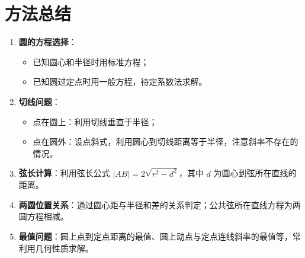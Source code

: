 \documentclass[11pt]{ctexrep}
\begin{document}
\section*{方法总结}

\begin{enumerate}
    \item \textbf{圆的方程选择}：
    \begin{itemize}
        \item 已知圆心和半径时用标准方程；
        \item 已知圆过定点时用一般方程，待定系数法求解。
    \end{itemize}
    \item \textbf{切线问题}：
    \begin{itemize}
        \item 点在圆上：利用切线垂直于半径；
        \item 点在圆外：设点斜式，利用圆心到切线距离等于半径，注意斜率不存在的情况。
    \end{itemize}
    \item \textbf{弦长计算}：利用弦长公式 $|AB| = 2\sqrt{r^2 - d^2}$，其中 $d$ 为圆心到弦所在直线的距离。
    \item \textbf{两圆位置关系}：通过圆心距与半径和差的关系判定；公共弦所在直线方程为两圆方程相减。
    \item \textbf{最值问题}：圆上点到定点距离的最值、圆上动点与定点连线斜率的最值等，常利用几何性质求解。
\end{enumerate}
\end{document}
